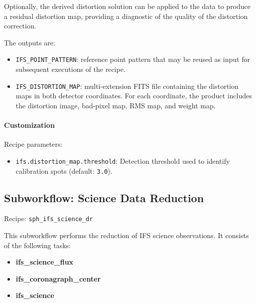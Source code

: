Optionally, the derived distortion solution can be applied to the data to
produce a residual distortion map, providing a diagnostic of the quality of
the distortion correction.

The outputs are:

\begin{itemize}
\item \texttt{IFS\_POINT\_PATTERN}: reference point pattern that may be
reused as input for subsequent executions of the recipe.

\item \texttt{IFS\_DISTORTION\_MAP}: multi-extension FITS file containing
the distortion maps in both detector coordinates. For each coordinate, the
product includes the distortion image, bad-pixel map, RMS map, and weight
map.
\end{itemize}

\paragraph{Customization}

Recipe parameters:

\begin{itemize}

\item \texttt{ifs.distortion\_map.threshold}:
Detection threshold used to identify calibration spots
(default: \texttt{3.0}).
\end{itemize}


\subsection{Subworkflow: Science Data Reduction}

Recipe:
\texttt{sph\_ifs\_science\_dr}

This subworkflow performs the reduction of IFS science observations. It
consists of the following tasks:

\begin{itemize}
\item \textbf{ifs\_science\_flux}
\item \textbf{ifs\_coronagraph\_center}
\item \textbf{ifs\_science}
\end{itemize}

